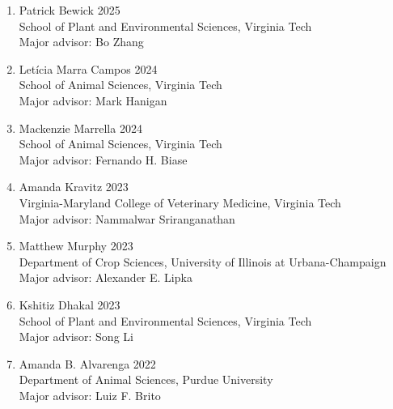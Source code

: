 \documentclass[margin,line,10pt]{res}
\begin{document}
\begin{resume}
\begin{enumerate}
  \vspace{0.3cm}

  \item [7.] Patrick Bewick  \hfill 2025 \\
  School of Plant and Environmental Sciences,  Virginia Tech \\
  Major advisor: Bo Zhang  

  \vspace{0.3cm}

  \item [6.] Let\'{i}cia Marra Campos  \hfill 2024 \\
  School of Animal Sciences,  Virginia Tech \\ 
  Major advisor: Mark Hanigan

  \vspace{0.3cm}

  \item [5.] Mackenzie Marrella \hfill 2024 \\
      School of Animal Sciences, Virginia Tech\\
      Major advisor: Fernando H. Biase
  
  \vspace{0.3cm}

  \item [4.] Amanda Kravitz  \hfill 2023 \\
  Virginia-Maryland College of Veterinary Medicine,  Virginia Tech \\ 
  Major advisor: Nammalwar Sriranganathan

  \vspace{0.3cm}

  \item [3.] Matthew Murphy \hfill 2023 \\
  Department of Crop Sciences, University of Illinois at Urbana-Champaign \\
  Major advisor: Alexander E. Lipka 

  \vspace{0.3cm}

  \item [2.] Kshitiz Dhakal \hfill 2023 \\
  School of Plant and Environmental Sciences,  Virginia Tech \\
  Major advisor: Song Li

  \vspace{0.3cm}

\item [1.] Amanda B. Alvarenga   \hfill 2022\\
  Department of Animal Sciences, Purdue University \\
  Major advisor: Luiz F. Brito
\end{enumerate}



\end{resume}
\end{document}
